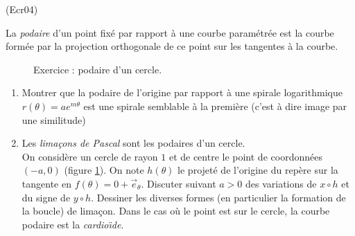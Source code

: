 \begin{tiny}(Ecr04)\end{tiny}
La \emph{podaire} d'un point fix{\'e} par rapport {\`a} une courbe param{\'e}tr{\'e}e est la courbe form{\'e}e par la projection orthogonale de ce point sur les tangentes {\`a} la courbe.
\begin{figure}[ht]
 \centering
 
 \caption{Exercice  : podaire d'un cercle.}
 \label{fig:Ecr04_1}
\end{figure}

\begin{enumerate}
\item Montrer que la podaire de l'origine par rapport {\`a} une spirale logarithmique $r(\theta )=ae^{m\theta }$ est une spirale semblable {\`a} la premi{\`e}re (c'est {\`a} dire image par une similitude)
\item Les \emph{lima\c{c}ons de Pascal} sont les podaires d'un cercle.\\
On considère un cercle de rayon $1$ et de centre le point de coordonnées $(-a,0)$ (figure \ref{fig:Ecr04_1}). On note $h(\theta)$ le projeté de l'origine du repère sur la tangente en $f(\theta)=0+\overrightarrow e_\theta$. Discuter suivant $a>0$ des variations de $x\circ h$ et du signe de $y\circ h$. Dessiner les diverses formes (en particulier la formation de la boucle) de lima\c{c}on. Dans le cas o{\`u} le point est sur le cercle, la courbe podaire est la \emph{cardio{\"\i}de}.
\end{enumerate}